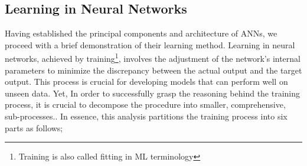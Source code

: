 \subsection{Learning in Neural Networks}
Having established the principal components and architecture of ANNs, we proceed with a brief demonstration of their learning method.
Learning in neural networks, achieved by training\footnote{Training is also called fitting in ML terminology}, involves the adjustment of the network’s
internal parameters to minimize the discrepancy between the actual output and the target output. This process is crucial for developing models that
can perform well on unseen data. Yet, In order to successfully grasp the reasoning behind the training process, it is crucial to decompose the procedure into
smaller, comprehensive, sub-processes.\cite{martyNeuralNetworksLearning2023}. In essence, this analysis partitions the training process into six parts as follows;

